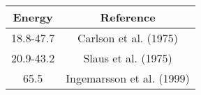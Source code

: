 \begin{tabular}{|c||c|} 
    \hline 
    \bf{Energy} & \bf{Reference} \\
    \hline
    \hline 
    18.8-47.7 & Carlson et al. (1975) \cite{Carlson1975}\\
    20.9-43.2 & Slaus et al. (1975) \cite{Slaus1975}\\
    65.5 & Ingemarsson et al. (1999) \cite{Ingemarsson1999}\\
    \hline
\end{tabular}
